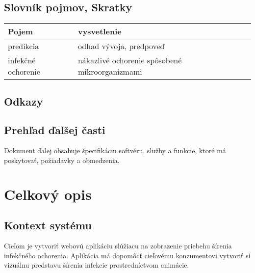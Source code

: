 \documentclass[12pt,a4paper]{report}
\begin{document}
\section[Slovník pojmov, Skratky]{\rmfamily\bfseries
	Slovník pojmov, Skratky}	
\begin{table}[h!]
	\centering
	\begin{tabular}{|>{\centering\arraybackslash}m{2in}|>{\centering\arraybackslash}m{1in}|}
		\hline
		\centering Pojem & vysvetlenie \\ [0ex]
		\hline
		predikcia & odhad vývoja, predpoveď \\ [0ex]
		\hline
		infekčné ochorenie & nákazlivé ochorenie spôsobené mikroorganizmami \\ [0ex]
		\hline
	\end{tabular}
\end{table}

\section[Odkazy]{\rmfamily\bfseries
	Odkazy}

\section[Prehľad ďalšej časti]{\rmfamily\bfseries
	Prehľad ďalšej časti}
Dokument ďalej obsahuje špecifikáciu softvéru, služby a funkcie, ktoré má poskytovať, požiadavky a obmedzenia. 

\renewcommand{\chaptername}{}	
\chapter[Celkový opis]{\rmfamily\bfseries
	Celkový opis}

\section[Kontext systému]{\rmfamily\bfseries
	Kontext systému}
	Cieľom je vytvoriť webovú aplikáciu slúžiacu na zobrazenie priebehu šírenia infekčného ochorenia. Aplikácia má dopomôcť cieľovému konzumentovi vytvoriť si vizuálnu predstavu šírenia infekcie prostredníctvom animácie.
\end{document}
